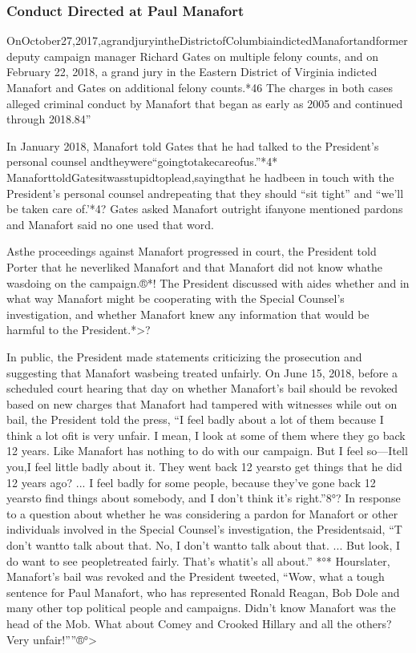 \subsubsection{Conduct Directed at Paul Manafort}

OnOctober27,2017,agrandjuryintheDistrictofColumbiaindictedManafortandformer deputy campaign manager Richard Gates on multiple felony counts, and on February 22, 2018, a grand jury in the Eastern District of Virginia indicted Manafort and Gates on additional felony counts.*46 The charges in both cases alleged criminal conduct by Manafort that began as early as 2005 and continued through 2018.84”

In January 2018, Manafort told Gates that he had talked to the President’s personal counsel andtheywere“goingtotakecareofus.”*4* ManaforttoldGatesitwasstupidtoplead,sayingthat he hadbeen in touch with the President’s personal counsel andrepeating that they should “sit tight” and “we’ll be taken care of.’*4? Gates asked Manafort outright ifanyone mentioned pardons and Manafort said no one used that word.

Asthe proceedings against Manafort progressed in court, the President told Porter that he neverliked Manafort and that Manafort did not know whathe wasdoing on the campaign.®*! The President discussed with aides whether and in what way Manafort might be cooperating with the Special Counsel’s investigation, and whether Manafort knew any information that would be harmful to the President.*>?

In public, the President made statements criticizing the prosecution and suggesting that Manafort wasbeing treated unfairly. On June 15, 2018, before a scheduled court hearing that day on whether Manafort’s bail should be revoked based on new charges that Manafort had tampered with witnesses while out on bail, the President told the press, “I feel badly about a lot of them because I think a lot ofit is very unfair. I mean, I look at some of them where they go back 12 years. Like Manafort has nothing to do with our campaign. But I feel so—Itell you,I feel little badly about it. They went back 12 yearsto get things that he did 12 years ago? ... I feel badly for some people, because they’ve gone back 12 yearsto find things about somebody, and I don’t think it’s right.”8°? In response to a question about whether he was considering a pardon for Manafort or other individuals involved in the Special Counsel’s investigation, the Presidentsaid, “T don’t wantto talk about that. No, I don’t wantto talk about that. ... But look, I do want to see peopletreated fairly. That’s whatit’s all about.” *°* Hourslater, Manafort’s bail was revoked and the President tweeted, “Wow, what a tough sentence for Paul Manafort, who has represented Ronald Reagan, Bob Dole and many other top political people and campaigns. Didn’t know Manafort was the head of the Mob. What about Comey and Crooked Hillary and all the others? Very unfair!””®°>

